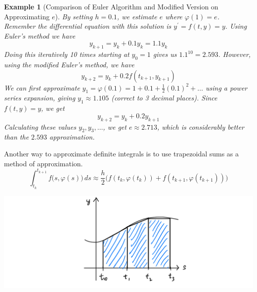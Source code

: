 \documentclass{article}
\newtheorem{example}{Example}[section]
\theoremstyle{remark}
\theoremstyle{definition}
\begin{document}
    \begin{example}[Comparison of Euler Algorithm and Modified Version on Approximating $e$]
    By setting $h = 0.1$, we estimate $e$ where $\varphi(1) = e$. Remember the differential equation with this solution is $y^\prime = f(t, y) = y$. Using Euler's method we have
    \[y_{k+1} = y_k + 0.1 y_k = 1.1y_k\]
    Doing this iteratively 10 times starting at $y_0 = 1$ gives us $1.1^{10} = 2.593$. However, using the modified Euler's method, we have 
    \[y_{k+2} = y_k + 0.2 f(t_{k+1}, y_{k+1})\]
    We can first approximate $y_1 = \varphi(0.1) = 1 + 0.1 + \frac{1}{2} (0.1)^2 + \ldots$ using a power series expansion, giving $y_1 \approx 1.105$ (correct to 3 decimal places). Since $f(t, y) = y$, we get 
    \[y_{k+2} = y_k + 0.2 y_{k+1}\]
    Calculating these values $y_2, y_3, \ldots$, we get $e \approx 2.713$, which is considerably better than the $2.593$ approximation. 
    \end{example}

    Another way to approximate definite integrals is to use trapezoidal sums as a method of approximation. 
    \[\int_{t_k}^{t_{k+1}} f\big(s, \varphi(s)\big)\,ds \approx \frac{h}{2}\big( f(t_k, \varphi(t_k)) + f(t_{k+1}, \varphi(t_{k+1}))\big)\]

    \begin{center}
        \includegraphics[scale=0.28]{img/Trapezoidal_Sum.PNG}
    \end{center}
\end{document}
